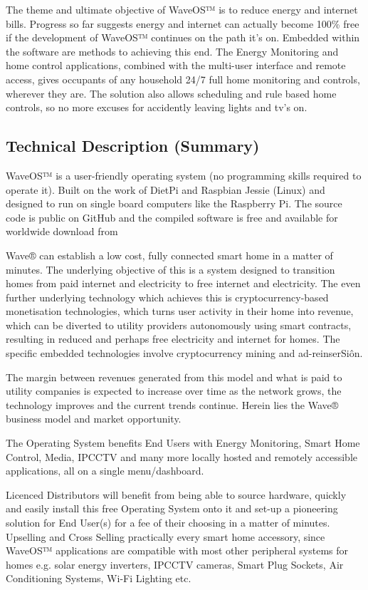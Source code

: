 \documentclass[letterpaper,10pt,openany,oneside,english]{sphinxmanual}
\begin{document}
The theme and ultimate objective of WaveOS™ is to reduce energy and internet bills. Progress so far suggests energy and internet can actually become 100\% free if the development of WaveOS™ continues on the path it’s on. Embedded within the software are methods to achieving this end. The Energy Monitoring and home control applications, combined with the multi-user interface and remote access, gives occupants of any household 24/7 full home monitoring and controls, wherever they are. The solution also allows scheduling and rule based home controls, so no more excuses for accidently leaving lights and tv’s on.


\subsection{Technical Description (Summary)}
\label{\detokenize{appendix-a:technical-description-summary}}
WaveOS™ is a user-friendly operating system (no programming skills required to operate it). Built on the work of DietPi and Raspbian Jessie (Linux) and designed to run on single board computers  like the Raspberry Pi. The source code is public on GitHub and the compiled software is free and available for worldwide download from 

Wave® can establish a low cost, fully connected smart home in a matter of minutes. The underlying objective of this is a system designed to transition homes from paid internet and electricity to free internet and electricity. The even further underlying technology which achieves this is cryptocurrency-based monetisation technologies, which turns user activity in their home into revenue, which can be diverted to utility providers autonomously using smart contracts, resulting in reduced and perhaps free electricity and internet for homes. The specific embedded technologies involve cryptocurrency mining and ad-reinserSiôn.

The margin between revenues generated from this model and what is paid to utility companies is expected to increase over time as the network grows, the technology improves and the current trends continue. Herein lies the Wave® business model and market opportunity.

The Operating System benefits End Users with Energy Monitoring, Smart Home Control, Media, IPCCTV and many more locally hosted and remotely accessible applications, all on a single menu/dashboard.

Licenced Distributors will benefit from being able to source hardware, quickly and easily install this free Operating System onto it and set-up a pioneering solution for End User(s) for a fee of their choosing in a matter of minutes. Upselling and Cross Selling practically every smart home accessory, since WaveOS™ applications are compatible with most other peripheral systems for homes e.g. solar energy inverters, IPCCTV cameras, Smart Plug Sockets, Air Conditioning Systems, Wi-Fi Lighting etc.
\end{document}
